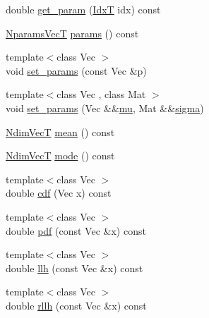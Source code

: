 \begin{DoxyCompactItemize}
\item 
double \hyperlink{classprior__hessian_1_1MultivariateNormalDist_ad5428f037acfa512f7f28747bfa8ff6d}{get\+\_\+param} (\hyperlink{namespaceprior__hessian_aa8d589f74e88bfa3b5750118acd1ab78}{IdxT} idx) const 
\item 
\hyperlink{classprior__hessian_1_1MultivariateNormalDist_ac690a8a9b00e4e0e159a15bb9c212852}{Nparams\+VecT} \hyperlink{classprior__hessian_1_1MultivariateNormalDist_a55a53ff4ea86375a8971a5334c000c9c}{params} () const 
\item 
{\footnotesize template$<$class Vec $>$ }\\void \hyperlink{classprior__hessian_1_1MultivariateNormalDist_af968e071050a9b2ba4b4ef96b206602b}{set\+\_\+params} (const Vec \&p)
\item 
{\footnotesize template$<$class Vec , class Mat $>$ }\\void \hyperlink{classprior__hessian_1_1MultivariateNormalDist_acd8f1638afb49a52bcb341f3a439574d}{set\+\_\+params} (Vec \&\&\hyperlink{classprior__hessian_1_1MultivariateNormalDist_a53e894d82ca08f285fc004b77301495d}{mu}, Mat \&\&\hyperlink{classprior__hessian_1_1MultivariateNormalDist_aa4e86dd2b8e088553aac8c6b0fa50832}{sigma})
\item 
\hyperlink{classprior__hessian_1_1MultivariateNormalDist_a0f5725cbbfa47be45b2741467dcd5615}{Ndim\+VecT} \hyperlink{classprior__hessian_1_1MultivariateNormalDist_af6e3b749b02b2afafadb01d76f96e334}{mean} () const 
\item 
\hyperlink{classprior__hessian_1_1MultivariateNormalDist_a0f5725cbbfa47be45b2741467dcd5615}{Ndim\+VecT} \hyperlink{classprior__hessian_1_1MultivariateNormalDist_afdec8e6a453a2c69e0d84833d6b3e5ae}{mode} () const 
\item 
{\footnotesize template$<$class Vec $>$ }\\double \hyperlink{classprior__hessian_1_1MultivariateNormalDist_a41f15a93e291cc18bf28c1c0118efa6a}{cdf} (Vec x) const 
\item 
{\footnotesize template$<$class Vec $>$ }\\double \hyperlink{classprior__hessian_1_1MultivariateNormalDist_a67cba536341528564330b17dcbe5faff}{pdf} (const Vec \&x) const 
\item 
{\footnotesize template$<$class Vec $>$ }\\double \hyperlink{classprior__hessian_1_1MultivariateNormalDist_a3540b1bcafd58fe26de858c0a4aef3db}{llh} (const Vec \&x) const 
\item 
{\footnotesize template$<$class Vec $>$ }\\double \hyperlink{classprior__hessian_1_1MultivariateNormalDist_a4512a641c493e33dfb93b5087e473c76}{rllh} (const Vec \&x) const 

\end{DoxyCompactItemize}
